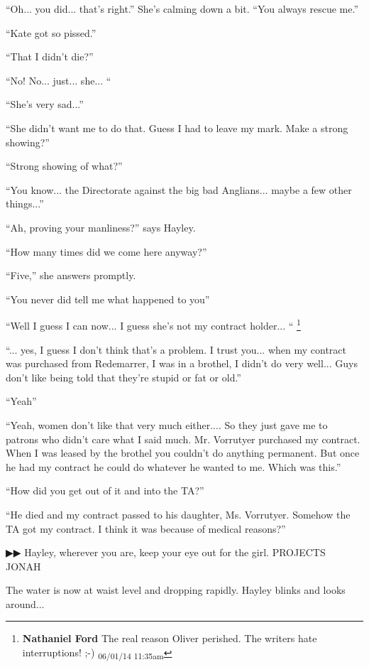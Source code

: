 ``Oh... you did... that's right.''  She's calming down a bit.  ``You always rescue me.''

``Kate got so pissed.''

``That I didn't die?''

``No! No... just... she... ``

``She's very sad...''

``She didn't want me to do that.  Guess I had to leave my mark.  Make a strong showing?''

``Strong showing of what?''

``You know... the Directorate against the big bad Anglians... maybe a few other things...''

``Ah, proving your manliness?'' says Hayley.

``How many times did we come here anyway?''

``Five,'' she answers promptly.

``You never did tell me what happened to you''

``Well I guess I can now... I guess she's not my contract holder... ``
\footnote{\textbf{Nathaniel Ford }The real reason Oliver perished. The writers hate interruptions! ;-) \textsubscript{06/01/14 11:35am}}

``... yes, I guess I don't think that's a problem.  I trust you... when my contract was purchased from Redemarrer, I was in a brothel, I didn't do very well... Guys don't like being told that they're stupid or fat or old.''

``Yeah''

``Yeah, women don't like that very much either.... So they just gave me to patrons who didn't care what I said much.  Mr. Vorrutyer purchased my contract.  When I was leased by the brothel you couldn't do anything permanent.  But once he had my contract he could do whatever he wanted to me.  Which was this.''

``How did you get out of it and into the TA?''

``He died and my contract passed to his daughter, Ms. Vorrutyer.  Somehow the TA got my contract.  I think it was because of medical reasons?''



 {\color[RGB]{68,68,68}▶▶}  Hayley, wherever you are, keep your eye out for the girl.  PROJECTS JONAH



The water is now at waist level and dropping rapidly.  Hayley blinks and looks around... 


